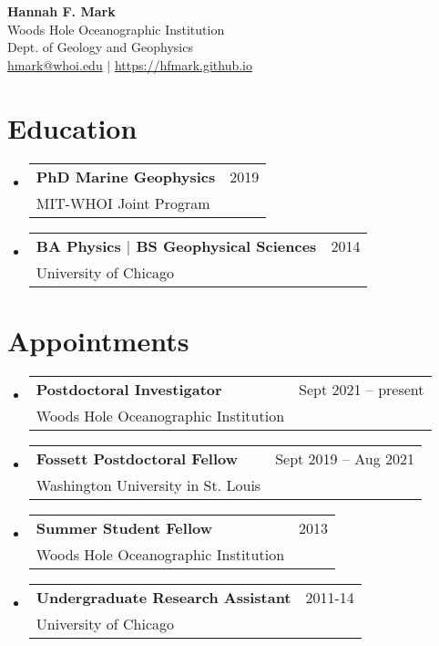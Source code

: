 \documentclass[letterpaper,11pt]{article}
\makeatletter
\newcommand{\resumeSubheading}[4]{
  \vspace{-2pt}\item
    \begin{tabular*}{0.97\textwidth}[t]{l@{\extracolsep{\fill}}r}
      \textbf{#1} & #2 \\
      \small#3 & \small #4 \\
    \end{tabular*}\vspace{-7pt}
}
\newcommand{\resumeAppt}[4]{
  \vspace{-2pt}\item
    \begin{tabular*}{0.97\textwidth}[t]{l@{\extracolsep{\fill}}r}
      \textbf{#1} & #2 \\
      \small#3 & \small #4 \\
    \end{tabular*}\vspace{-7pt}
}
\newcommand{\resumeSubHeadingListStart}{\begin{itemize}[leftmargin=0.15in, label={}]}
\newcommand{\resumeSubHeadingListEnd}{\end{itemize}}
\makeatother
\begin{document}
\begin{center}
    \textbf{\LARGE Hannah F. Mark} \\ \vspace{1pt}
    \small Woods Hole Oceanographic Institution \\
    \small Dept. of Geology and Geophysics \\
    \small \href{mailto:hmark@whoi.edu}{hmark@whoi.edu} $|$
    \href{https://hfmark.github.io}{https://hfmark.github.io}
\end{center}


\section{Education}
  \resumeSubHeadingListStart
    \resumeSubheading
      {PhD Marine Geophysics}{2019}
      {MIT-WHOI Joint Program}{}%
    \resumeSubheading
      {BA Physics $|$ BS Geophysical Sciences}{2014}
      {University of Chicago}{}%
  \resumeSubHeadingListEnd


\section{Appointments}
  \resumeSubHeadingListStart

    \resumeAppt
      {Postdoctoral Investigator}{Sept 2021 -- present}
      {Woods Hole Oceanographic Institution}{}%

    \resumeAppt
      {Fossett Postdoctoral Fellow}{Sept 2019 -- Aug 2021}
      {Washington University in St. Louis}{}%

    \resumeAppt
      {Summer Student Fellow}{2013}
      {Woods Hole Oceanographic Institution}{}%

    \resumeAppt
      {Undergraduate Research Assistant}{2011-14}
      {University of Chicago}{}%

  \resumeSubHeadingListEnd


\end{document}
